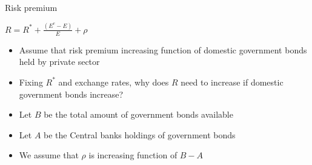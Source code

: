 \documentclass{beamer}
\begin{document}

\begin{frame}{Risk premium}

\begin{center}
$  R = R^{*}+ \frac{\left(E^{e} -E\right)}{E}+\rho$
\end{center}

\begin{itemize}
    \item Assume that risk premium increasing function of domestic government bonds held by private sector
    \item Fixing $R^*$ and exchange rates, why does $R$ need to increase if domestic government bonds increase?
    \item Let $B$ be the total amount of government bonds available
    \item Let $A$ be the Central banks holdings of government bonds
    \item We assume that $\rho$ is increasing function of $B-A$ 
\end{itemize}

\end{frame}
\end{document}
